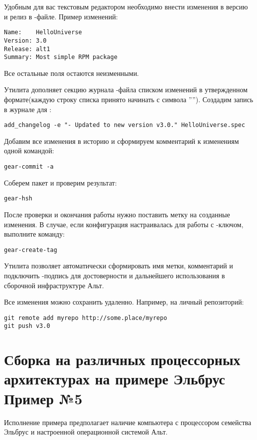 Удобным для вас текстовым редактором необходимо внести изменения в версию и релиз
в -файле. Пример изменений:
\begin{verbatim}
Name:    HelloUniverse
Version: 3.0
Release: alt1
Summary: Most simple RPM package
\end{verbatim}
Все остальные поля остаются неизменными.

Утилита  дополняет секцию журнала -файла
списком изменений в утвержденном формате(каждую строку списка принято начинать
с символа ''\Sys{-}''). Создадим запись в журнале для :
\begin{verbatim}
add_changelog -e "- Updated to new version v3.0." HelloUniverse.spec
\end{verbatim}

Добавим все изменения в историю  и сформируем комментарий к изменениям
одной командой:
\begin{verbatim}
gear-commit -a
\end{verbatim}

Соберем пакет и проверим результат:
\begin{verbatim}
gear-hsh
\end{verbatim}

После проверки и окончания работы нужно поставить метку на созданные изменения.
В случае, если конфигурация  настраивалась для работы с -ключом,
выполните команду:
\begin{verbatim}
gear-create-tag
\end{verbatim}
Утилита  позволяет автоматически сформировать имя метки, комментарий
и подключить -подпись для достоверности и дальнейшего использования в
сборочной инфраструктуре Альт.

Все изменения можно сохранить удаленно. Например, на личный репозиторий:
\begin{verbatim}
git remote add myrepo http://some.place/myrepo
git push v3.0
\end{verbatim}

\section{Сборка на различных процессорных архитектурах на примере Эльбрус \textbf{Пример №5}}

Исполнение примера предполагает наличие компьютера с процессором семейства
Эльбрус и настроенной операционной системой Альт.

